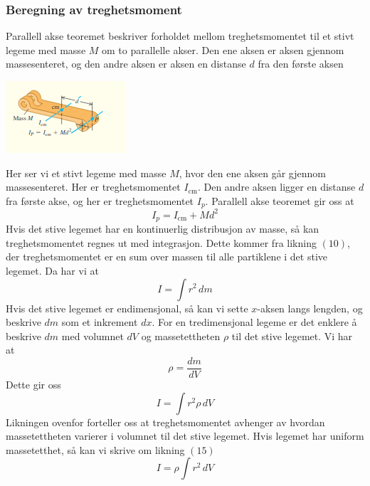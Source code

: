 \subsubsection{Beregning av treghetsmoment}
Parallell akse teoremet beskriver forholdet mellom treghetsmomentet til et stivt legeme med masse $M$ om to parallelle akser. Den ene aksen er aksen gjennom massesenteret, og den andre aksen er aksen en distanse $d$ fra den første aksen
\begin{center}
\includegraphics{rapport/teori/bilder/parallell.png}
\end{center}
Her ser vi et stivt legeme med masse $M$, hvor den ene aksen går gjennom massesenteret. Her er treghetsmomentet $I_\text{cm}$. Den andre aksen ligger en distanse $d$ fra første akse, og her er treghetsmomentet $I_p.$\cite{FYSIKK:1} Parallell akse teoremet gir oss at
\begin{equation}
    I_p=I_\text{cm}+Md^2
\end{equation}
Hvis det stive legemet har en kontinuerlig distribusjon av masse, så kan treghetsmomentet regnes ut med integrasjon. Dette kommer fra likning $(10)$, der treghetsmomentet er en sum over massen til alle partiklene i det stive legemet. Da har vi at
\begin{equation}
    I=\int{r^2\,dm}
\end{equation}
Hvis det stive legemet er endimensjonal, så kan vi sette $x$-aksen langs lengden, og beskrive $dm$ som et inkrement $dx.$ For en tredimensjonal legeme er det enklere å beskrive $dm$ med volumnet $dV$ og massetettheten $\rho$ til det stive legemet. Vi har at
\begin{equation}
    \rho=\frac{dm}{dV}
\end{equation}
Dette gir oss
\begin{equation}
    I=\int{r^2\rho\,dV}
\end{equation}
Likningen ovenfor forteller oss at treghetsmomentet avhenger av hvordan massetettheten varierer i volumnet til det stive legemet. Hvis legemet har uniform massetetthet, så kan vi skrive om likning $(15)$
\begin{equation}
    I=\rho\int{r^2\,dV}
\end{equation}
